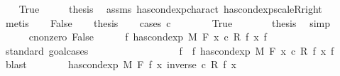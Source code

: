 \begin{isabellebody}
\ \ \isamarkupfalse%
\ True\isanewline
\ \ \isamarkupfalse%
\ \isamarkupfalse%
\ {\isacharquery}{\kern0pt}thesis\ \isamarkupfalse%
\ assms\ has{\isacharunderscore}{\kern0pt}cond{\isacharunderscore}{\kern0pt}exp{\isacharunderscore}{\kern0pt}charact\ has{\isacharunderscore}{\kern0pt}cond{\isacharunderscore}{\kern0pt}exp{\isacharunderscore}{\kern0pt}scaleR{\isacharunderscore}{\kern0pt}right\ \isamarkupfalse%
\ metis\isanewline
{}\isamarkupfalse%
\isanewline
\ \ \isamarkupfalse%
\ False\isanewline
\ \ \isamarkupfalse%
\ {\isacharquery}{\kern0pt}thesis\isanewline
\ \ \isamarkupfalse%
\ {\isacharparenleft}{\kern0pt}cases\ {\isachardoublequoteopen}c\ {\isacharequal}{\kern0pt}\ {}{\isachardoublequoteclose}{\isacharparenright}{\kern0pt}\isanewline
\ \ \ \ \isamarkupfalse%
\ True\isanewline
\ \ \ \ \isamarkupfalse%
\ \isamarkupfalse%
\ {\isacharquery}{\kern0pt}thesis\ \isamarkupfalse%
\ simp\isanewline
\ \ \isamarkupfalse%
\isanewline
\ \ \ \ \isamarkupfalse%
\ c{\isacharunderscore}{\kern0pt}nonzero{\isacharcolon}{\kern0pt}\ False\isanewline
\ \ \ \ \isamarkupfalse%
\ {\isachardoublequoteopen}{\isasymnexists}f{\isacharprime}{\kern0pt}{\isachardot}{\kern0pt}\ has{\isacharunderscore}{\kern0pt}cond{\isacharunderscore}{\kern0pt}exp\ M\ F\ {\isacharparenleft}{\kern0pt}{\isasymlambda}x{\isachardot}{\kern0pt}\ c\ {\isacharasterisk}{\kern0pt}\isactrlsub R\ f\ x{\isacharparenright}{\kern0pt}\ f{\isacharprime}{\kern0pt}{\isachardoublequoteclose}\isanewline
\ \ \ \ \isamarkupfalse%
\ {\isacharparenleft}{\kern0pt}standard{\isacharcomma}{\kern0pt}\ goal{\isacharunderscore}{\kern0pt}cases{\isacharparenright}{\kern0pt}\isanewline
\ \ \ \ \ \ \isamarkupfalse%
\ {}\isanewline
\ \ \ \ \ \ \isamarkupfalse%
\ \isamarkupfalse%
\ f{\isacharprime}{\kern0pt}\ \ f{\isacharprime}{\kern0pt}{\isacharcolon}{\kern0pt}\ {\isachardoublequoteopen}has{\isacharunderscore}{\kern0pt}cond{\isacharunderscore}{\kern0pt}exp\ M\ F\ {\isacharparenleft}{\kern0pt}{\isasymlambda}x{\isachardot}{\kern0pt}\ c\ {\isacharasterisk}{\kern0pt}\isactrlsub R\ f\ x{\isacharparenright}{\kern0pt}\ f{\isacharprime}{\kern0pt}{\isachardoublequoteclose}\ \isamarkupfalse%
\ blast\isanewline
\ \ \ \ \ \ \isamarkupfalse%
\ {\isachardoublequoteopen}has{\isacharunderscore}{\kern0pt}cond{\isacharunderscore}{\kern0pt}exp\ M\ F\ f\ {\isacharparenleft}{\kern0pt}{\isasymlambda}x{\isachardot}{\kern0pt}\ inverse\ c\ {\isacharasterisk}{\kern0pt}\isactrlsub R\ f{\isacharprime}{\kern0pt}\ x{\isacharparenright}{\kern0pt}{\isachardoublequoteclose}\ \isamarkupfalse%

\end{isabellebody}

